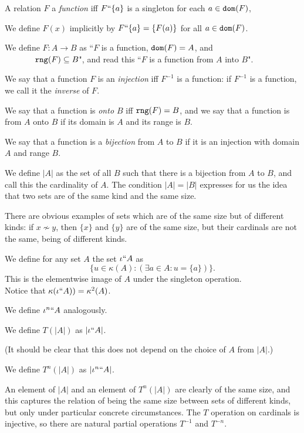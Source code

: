\documentclass[12pt]{article}
\begin{document}
  \begin{dfn}\label{dfn:card}\mbox{\negthinspace}
    
    A relation $F$ a {\em function\/} iff $F``\{a\}$ is a singleton for each $a \in {\tt dom}(F)$,
  
We define $F(x)$ implicitly by $F``\{a\} = \{F(a)\}$ for all $a \in {\tt dom}(F)$.

We define $F:A \rightarrow B$ as ``$F$ is a
function, ${\tt dom}(F)=A$, and\\ \mbox{\, \, \, \,  \, } ${\tt rng}(F) \subseteq B$", and read
this ``$F$ is a function from $A$ into $B$".

We say that a function $F$ is an {\em injection\/} iff $F^{-1}$ is a
function: if $F^{-1}$ is a function, we call it the {\em inverse\/} of
$F$.

We say that a function is {\em onto $B$} iff ${\tt rng}(F)=B$, and we
say that a function is from $A$ onto $B$ if its domain is $A$ and its
range is $B$.

We say that a function is a {\em bijection\/} from $A$ to $B$ if
it is an injection with domain $A$ and range $B$.

We define $|A|$ as the set of all $B$ such that there is a bijection
from $A$ to $B$, and call this the cardinality of $A$.  The condition
$|A|=|B|$ expresses for us the idea that two sets are of the same kind
and the same size.
  \end{dfn}

  There are obvious examples of sets which are of the same size but of
different kinds: if $x \not\sim y$, then $\{x\}$ and $\{y\}$ are of
the same size, but their cardinals are not the same, being of
different kinds.


\begin{dfn}\mbox{\negthinspace}

  We define for any set $A$ the set $\iota``A$ as $$\{u \in \kappa(A):(\exists a \in A:u=\{a\})\}.$$  This is the elementwise image of $A$ under the singleton operation.\\  Notice that $\kappa(\iota``A)) = \kappa^2(A)$.

  We define $\iota^n``A$ analogously.

  We define $T(|A|)$ as $|\iota``A|$.

  (It should be clear that this does not depend on the choice of $A$ from $|A|$.)

  We define $T^n(|A|)$ as $|\iota^n``A|$.\end{dfn}
An element of $|A|$ and an element of $T^n(|A|)$ are clearly of the same size, and this captures the relation of being the same size between sets of different kinds, but only under particular concrete circumstances.  The $T$ operation on cardinals is injective, so there are natural partial operations $T^{-1}$ and $T^{-n}$.
\end{document}
